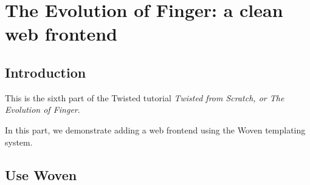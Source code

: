 \section{The Evolution of Finger: a clean web frontend\label{doc/howto/tutorial/web.xhtml}}


\subsection{Introduction}


 This is the sixth part of the Twisted tutorial \textit{Twisted from Scratch, or The Evolution of Finger}.

In this part, we demonstrate adding a web frontend using the Woven templating system.

\subsection{Use Woven}


